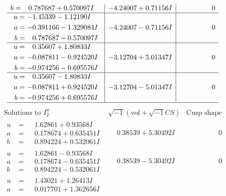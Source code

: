 \documentclass[1p]{elsarticle_modified}
\theoremstyle{definition}
\newcommand{\I}{\sqrt{-1}}
\begin{document}
$$\begin{array}{c|c|c}
\begin{aligned}
b &= \phantom{-}0.787687 + 0.570097 I\end{aligned}
 & -4.24007 + 0.71156 I & \phantom{-0.000000 } 0 \\ \hline\begin{aligned}
u &= -1.45339 - 1.12190 I \\
a &= -0.391166 - 1.329084 I \\
b &= \phantom{-}0.787687 - 0.570097 I\end{aligned}
 & -4.24007 - 0.71156 I & \phantom{-0.000000 } 0 \\ \hline\begin{aligned}
u &= \phantom{-}0.35607 + 1.80833 I \\
a &= -0.087811 - 0.924520 I \\
b &= -0.974256 - 0.695576 I\end{aligned}
 & -3.12704 + 5.01347 I & \phantom{-0.000000 } 0 \\ \hline\begin{aligned}
u &= \phantom{-}0.35607 - 1.80833 I \\
a &= -0.087811 + 0.924520 I \\
b &= -0.974256 + 0.695576 I\end{aligned}
 & -3.12704 - 5.01347 I & \phantom{-0.000000 } 0\\
 \hline 
 \end{array}$$\newpage$$\begin{array}{c|c|c}  
\text{Solutions to }I^u_{2}& \I (\text{vol} + \sqrt{-1}CS) & \text{Cusp shape}\\
 \hline 
\begin{aligned}
u &= \phantom{-}1.62861 + 0.93568 I \\
a &= \phantom{-}0.178674 + 0.635451 I \\
b &= \phantom{-}0.894224 + 0.532061 I\end{aligned}
 & \phantom{-}0.38539 + 5.30492 I & \phantom{-0.000000 } 0 \\ \hline\begin{aligned}
u &= \phantom{-}1.62861 - 0.93568 I \\
a &= \phantom{-}0.178674 - 0.635451 I \\
b &= \phantom{-}0.894224 - 0.532061 I\end{aligned}
 & \phantom{-}0.38539 - 5.30492 I & \phantom{-0.000000 } 0 \\ \hline\begin{aligned}
u &= \phantom{-}1.43021 + 1.26413 I \\
a &= \phantom{-}0.017701 + 1.362656 I \\

\end{aligned}
\end{array}$$
\end{document}
